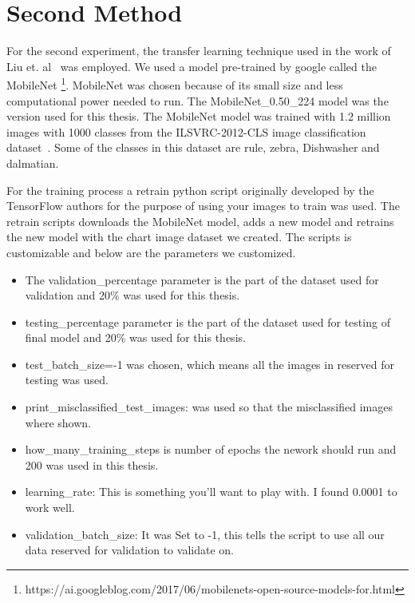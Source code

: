 \documentclass[12pt, a4paper,oneside]{report}
\begin{document}
\section{Second Method}
For the second experiment, the transfer learning technique used in the work of Liu et. al~\cite{liu2015chart} was employed. We used a model pre-trained by google called the MobileNet \footnote{https://ai.googleblog.com/2017/06/mobilenets-open-source-models-for.html}. MobileNet was chosen because of its small size and less computational power needed to run. The MobileNet\_0.50\_224 model was the version used for this thesis. The MobileNet model was trained with 1.2 million images with 1000 classes from the ILSVRC-2012-CLS image classification dataset~\cite{ILSVRC15}. Some of the classes in this dataset are rule, zebra, Dishwasher and dalmatian.\newline

For the training process a retrain python script originally developed by the TensorFlow authors for the purpose of using your images to train was used. The retrain scripts downloads the MobileNet model, adds a new model and retrains the new model with the chart image dataset we created. The scripts is customizable and below are the parameters we customized.

\begin{itemize}
	
	\item The validation\_percentage parameter is the part of the dataset used for validation and 20\% was used for this thesis.
	
	\item testing\_percentage parameter is the part of the dataset used for testing of final model and 20\% was used for this thesis.
	
	\item test\_batch\_size=-1 was chosen, which means all the images in reserved for testing was used.
	
	\item print\_misclassified\_test\_images:  was used so that the misclassified images where shown.
	
	\item how\_many\_training\_steps is number of epochs the nework should run and 200 was used in this thesis.
	
	\item learning\_rate: This is something you’ll want to play with. I found 0.0001 to work well.
	
	\item validation\_batch\_size: It was Set to -1, this tells the script to use all our data reserved for validation to validate on.
\end{itemize}
\end{document}
